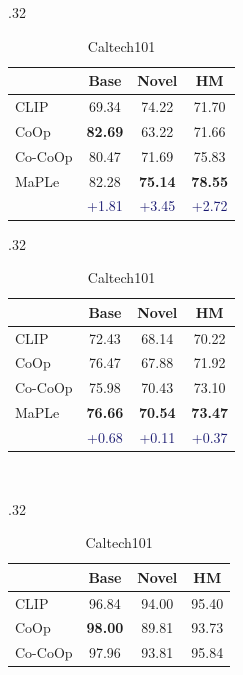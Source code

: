 \documentclass[10pt,twocolumn,letterpaper]{article}
\newcommand{\tableCellHeight}{1}
\newcommand{\tabstyle}[1]{
  \setlength{\tabcolsep}{#1}
  \renewcommand{\arraystretch}{\tableCellHeight}
  \centering
  \small
}
\newcommand{\tablestyle}[2]{\setlength{\tabcolsep}{#1}\renewcommand{\arraystretch}{#2}\centering\footnotesize}
\begin{document}
\begin{table}[t!]
\tablestyle{6pt}{0}
\addtolength{\tabcolsep}{-6pt}
    \tabstyle{1.5pt}
    \setlength{\tabcolsep}{6pt}
    \begin{subtable}[t]{.32\textwidth}
    \centering
    \caption{\textbf{Average over 11 datasets}}
    \begin{tabular}{l cc|c}
    \toprule
    & Base & Novel & HM \\
    \midrule
    CLIP & 69.34 & 74.22 & 71.70 \\
    CoOp & \textbf{82.69} & 63.22 & 71.66 \\
    Co-CoOp & 80.47 & 71.69 & 75.83 \\
    \midrule
    \rowcolor{tabhighlight}
    MaPLe & 82.28 & \textbf{75.14} & \textbf{78.55} \\
     &  \textcolor{MidnightBlue}{{+1.81}} &  \textcolor{MidnightBlue}{{+3.45}} &  \textcolor{MidnightBlue}{{+2.72}} \\
    \bottomrule
    \end{tabular}
    \end{subtable}
    \vspace{1em}
    \begin{subtable}[t]{.32\textwidth}
    \centering
    \caption{ImageNet.}
    \begin{tabular}{l cc|c}
    \toprule
    & Base & Novel & HM \\
    \midrule
    CLIP & 72.43 & 68.14 & 70.22 \\
    CoOp & {76.47} & 67.88 & 71.92\\
    Co-CoOp & 75.98 & {70.43} & {73.10} \\
    \midrule
    \rowcolor{tabhighlight}
    MaPLe & \textbf{76.66} & \textbf{70.54} & \textbf{73.47} \\
      &  \textcolor{MidnightBlue}{{+0.68}} &  \textcolor{MidnightBlue}{{+0.11}} &  \textcolor{MidnightBlue}{{+0.37}} \\
    \bottomrule
    \end{tabular}
    \end{subtable}
    ~
    \begin{subtable}[t]{.32\textwidth}
    \centering
    \caption{Caltech101}
    \begin{tabular}{l cc|c}
    \toprule
    & Base & Novel & HM \\
    \midrule
    CLIP & 96.84 & {94.00} & 95.40 \\
    CoOp & \textbf{98.00} & 89.81 & 93.73 \\
    Co-CoOp & 97.96 & 93.81 & {95.84} \\

\end{tabular}
\end{subtable}
\end{table}
\end{document}
